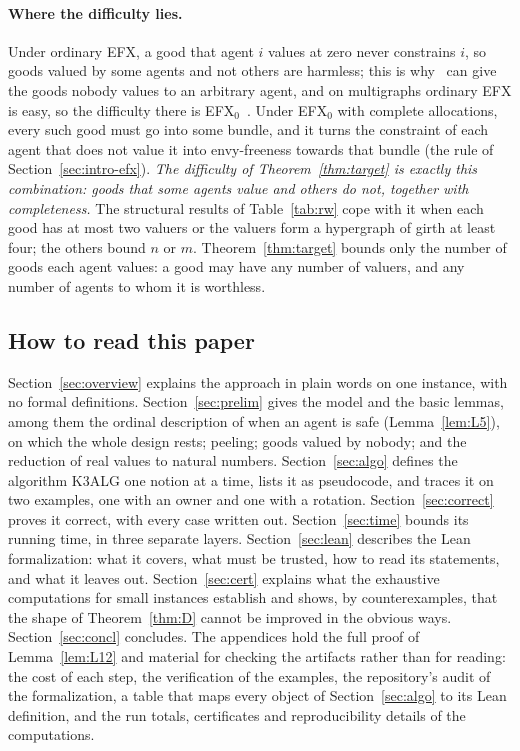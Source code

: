 \documentclass[runningheads,11pt]{llncs}
\newcommand{\efxz}{\texorpdfstring{\mbox{EFX$_0$}}{EFX0}}
\begin{document}
\paragraph{Where the difficulty lies.} Under ordinary EFX, a good that agent $i$ values at zero never constrains $i$, so goods valued by some agents and not others are harmless; this is why~\cite{ViswanathanM24} can give the goods nobody values to an arbitrary agent, and on multigraphs ordinary EFX is easy, so the difficulty there is \efxz{}~\cite{SgouritsaS25}. Under \efxz{} with complete allocations, every such good must go into some bundle, and it turns the constraint of each agent that does not value it into envy-freeness towards that bundle (the rule of Section~\ref{sec:intro-efx}). \emph{The difficulty of Theorem~\ref{thm:target} is exactly this combination: goods that some agents value and others do not, together with completeness.} The structural results of Table~\ref{tab:rw} cope with it when each good has at most two valuers or the valuers form a hypergraph of girth at least four; the others bound $n$ or $m$. Theorem~\ref{thm:target} bounds only the number of goods each agent values: a good may have any number of valuers, and any number of agents to whom it is worthless.

\subsection{How to read this paper}\label{sec:roadmap}

Section~\ref{sec:overview} explains the approach in plain words on one instance, with no formal definitions. Section~\ref{sec:prelim} gives the model and the basic lemmas, among them the ordinal description of when an agent is safe (Lemma~\ref{lem:L5}), on which the whole design rests; peeling; goods valued by nobody; and the reduction of real values to natural numbers. Section~\ref{sec:algo} defines the algorithm K3ALG one notion at a time, lists it as pseudocode, and traces it on two examples, one with an owner and one with a rotation. Section~\ref{sec:correct} proves it correct, with every case written out. Section~\ref{sec:time} bounds its running time, in three separate layers. Section~\ref{sec:lean} describes the Lean formalization: what it covers, what must be trusted, how to read its statements, and what it leaves out. Section~\ref{sec:cert} explains what the exhaustive computations for small instances establish and shows, by counterexamples, that the shape of Theorem~\ref{thm:D} cannot be improved in the obvious ways. Section~\ref{sec:concl} concludes. The appendices hold the full proof of Lemma~\ref{lem:L12} and material for checking the artifacts rather than for reading: the cost of each step, the verification of the examples, the repository's audit of the formalization, a table that maps every object of Section~\ref{sec:algo} to its Lean definition, and the run totals, certificates and reproducibility details of the computations.
\end{document}
